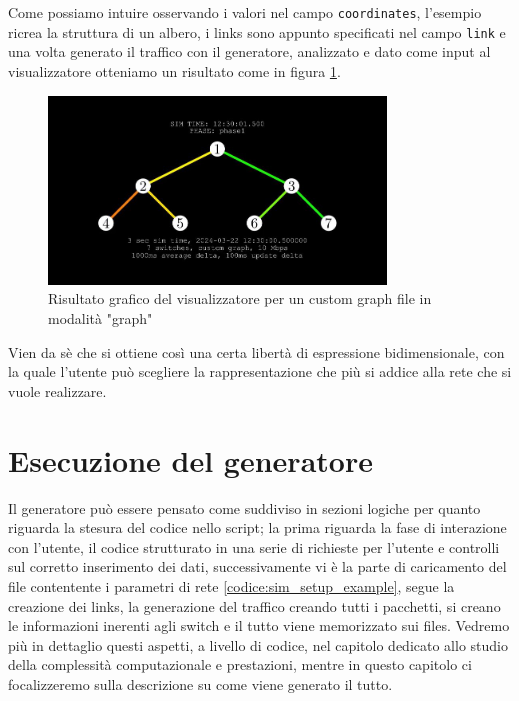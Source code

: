 \documentclass[binding=0.6cm]{sapthesis}
\begin{document}
Come possiamo intuire osservando i valori nel campo \texttt{coordinates}, l'esempio ricrea la struttura di un albero, i links sono appunto specificati 
nel campo  \texttt{link} e una volta generato il traffico con il generatore, analizzato e dato come input 
al visualizzatore otteniamo un risultato come in figura \ref{fig:tree_custom}.
\newline
\begin{figure}[h]
    \centering
    \includegraphics[width=0.8\textwidth]{immagini/free_graph.JPG}
    \caption{Risultato grafico del visualizzatore per un custom graph file in modalità "graph"}
    \label{fig:tree_custom}
\end{figure}
Vien da sè che si ottiene così una certa libertà di espressione bidimensionale, con la quale l'utente può scegliere
la rappresentazione che più si addice alla rete che si vuole realizzare.

\section{Esecuzione del generatore}
\label{sec:esecuzione_del_generatore}
Il generatore può essere pensato come suddiviso in sezioni logiche per quanto riguarda la stesura del codice nello script; la prima riguarda la fase
di interazione con l'utente, il codice  strutturato in una serie di richieste per l'utente e controlli sul corretto inserimento dei dati, successivamente
vi è la parte di caricamento del file contentente i parametri di rete \ref{codice:sim_setup_example}, segue la creazione dei links, la generazione del traffico
creando tutti i pacchetti, si creano le informazioni inerenti agli switch e il tutto viene memorizzato sui files. Vedremo più in dettaglio questi
aspetti, a livello di codice, nel capitolo dedicato allo studio della complessità computazionale e prestazioni, mentre in questo capitolo ci focalizzeremo
sulla descrizione su come viene generato il tutto.
\end{document}
